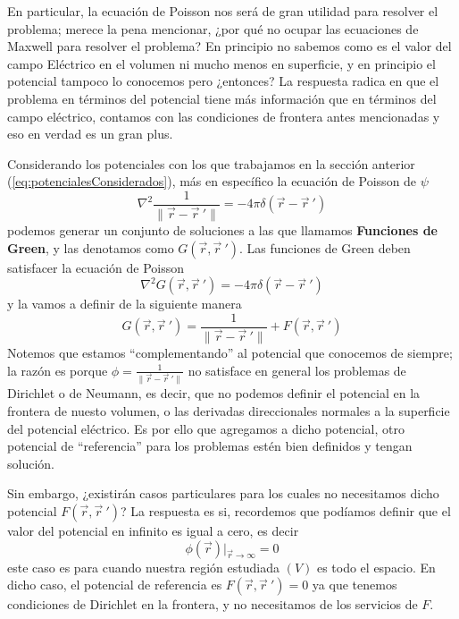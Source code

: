 \documentclass[11pt,a4paper]{article}
\begin{document}
En particular, la ecuación de Poisson nos será de gran utilidad para resolver el problema; merece la pena mencionar, ¿por qué no ocupar las ecuaciones de Maxwell para resolver el problema? En principio no sabemos como es el valor del campo Eléctrico en el volumen ni mucho menos en superficie, y en principio el potencial tampoco lo conocemos pero ¿entonces? La respuesta radica en que el problema en términos del potencial tiene más información que en términos del campo eléctrico, contamos con las condiciones de frontera antes mencionadas y eso en verdad es un gran plus.

Considerando los potenciales con los que trabajamos en la sección anterior (\ref{eq:potencialesConsiderados}), más en específico la ecuación de Poisson de $\psi$
$$\nabla^2\frac{1}{\|\vec{r}-\vec{r}\ '\|}=-4\pi\delta(\vec{r}-\vec{r}\ ')$$
podemos generar un conjunto de soluciones a las que llamamos \textbf{Funciones de Green}, y las denotamos como $G(\vec{r},\vec{r}\ ')$. Las funciones de Green deben satisfacer la ecuación de Poisson
$$\nabla^2G(\vec{r},\vec{r}\ ')=-4\pi\delta(\vec{r}-\vec{r}\ ')$$
y la vamos a definir de la siguiente manera
\begin{equation}\label{eq:funciondeGreen}
G(\vec{r},\vec{r}\ ')=\frac{1}{\|\vec{r}-\vec{r}\ '\|}+F(\vec{r},\vec{r}\ ')
\end{equation}
Notemos que estamos “complementando'' al potencial que conocemos de siempre; la razón es porque $\phi=\frac{1}{\|\vec{r}-\vec{r}\ '\|}$ no satisface en general los problemas de Dirichlet o de Neumann, es decir, que no podemos definir el potencial en la frontera de nuesto volumen, o las derivadas direccionales normales a la superficie del potencial eléctrico. Es por ello que agregamos a dicho potencial, otro potencial de “referencia'' para los problemas estén bien definidos y tengan solución.

Sin embargo, ¿existirán casos particulares para los cuales no necesitamos dicho potencial $F(\vec{r},\vec{r}\ ')$? La respuesta es si, recordemos que podíamos definir que el valor del potencial en infinito es igual a cero, es decir
$$\phi(\vec{r})\big |_{\vec{r}\to\infty}=0$$
este caso es para cuando nuestra región estudiada $(V)$ es todo el espacio. En dicho caso, el potencial de referencia es $F(\vec{r},\vec{r}\ ')=0$ ya que tenemos condiciones de Dirichlet en la frontera, y no necesitamos de los servicios de $F$.
\end{document}
